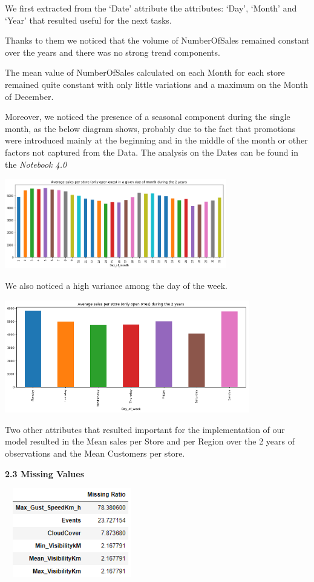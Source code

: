 \documentclass[]{article}
\begin{document}
We first extracted from the `Date' attribute the attributes: `Day',
`Month' and `Year' that resulted useful for the next tasks.

Thanks to them we noticed that the volume of NumberOfSales remained
constant over the years and there was no strong trend components.

The mean value of NumberOfSales calculated on each Month for each store
remained quite constant with only little variations and a maximum on the
Month of December.

Moreover, we noticed the presence of a seasonal component during the
single month, as the below diagram shows, probably due to the fact that
promotions were introduced mainly at the beginning and in the middle of
the month or other factors not captured from the Data. The analysis on
the Dates can be found in the \emph{Notebook 4.0}

\includegraphics[width=3.80208in,height=1.54167in]{media/image4.png}

We also noticed a high variance among the day of the week.

\includegraphics[width=4.20208in,height=1.93611in]{media/image5.png}

Two other attributes that resulted important for the implementation of
our model resulted in the Mean sales per Store and per Region over the 2
years of observations and the Mean Customers per store.

\textbf{2.3 Missing Values}

\includegraphics[width=2.31667in,height=1.53229in]{media/image6.png}
\end{document}
